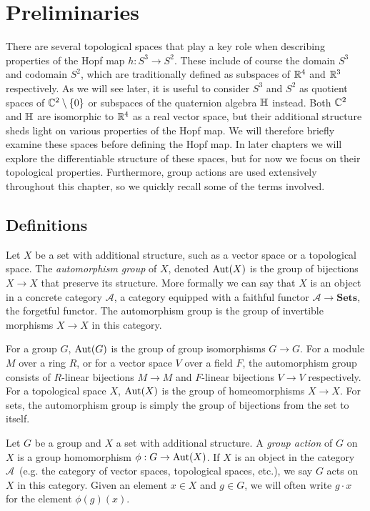 
\chapter{Preliminaries}
\label{chap:preliminaries}
There are several topological spaces that play a key role
when describing properties of the Hopf map $h : S^3 \to S^2\!$.
These include of course the domain $S^3$ and codomain $S^2\!$,
which are traditionally defined as subspaces of $\mathbb{R}^4$ and $\mathbb{R}^3$ respectively.
As we will see later,
it is useful to consider $S^3$ and $S^2$ as quotient spaces of $\mathbb{C}^2 \setminus \{ 0 \}$
or subspaces of the quaternion algebra $\mathbb{H}$ instead.
Both $\mathbb{C}^2$ and $\mathbb{H}$ are isomorphic to $\mathbb{R}^4$ as a real vector space,
but their additional structure sheds light on various properties of the Hopf map.
We will therefore briefly examine these spaces before defining the Hopf map.
In later chapters we will explore the differentiable structure of these spaces,
but for now we focus on their topological properties.
Furthermore, group actions are used extensively throughout this chapter,
so we quickly recall some of the terms involved.

\section{Definitions}

Let $X$ be a set with additional structure,
such as a vector space or a topological space.
The \emph{automorphism group} of $X$,
denoted $\operatorname{Aut}(X)$ is the group of bijections $X \to X$
that preserve its structure.
More formally we can say that $X$ is an object in a concrete category $\mathcal{A}$,
a category equipped with a faithful functor $\mathcal{A} \to \mathbf{Sets}$,
the forgetful functor.
The automorphism group is the group of invertible morphisms $X \to X$
in this category.

\example
For a group $G$, $\operatorname{Aut}(G)$ is the group of group isomorphisms $G \to G$.
For a module $M$ over a ring $R$,
or for a vector space $V$ over a field $F$,
the automorphism group consists of $R$-linear bijections $M \to M$
and $F$-linear bijections $V \to V$ respectively.
For a topological space $X$,
$\operatorname{Aut}(X)$ is the group of homeomorphisms $X \to X$.
For sets, the automorphism group is simply the group of bijections
from the set to itself.

Let $G$ be a group and $X$ a set with additional structure.
A \emph{group action} of $G$ on $X$ is a group homomorphism $\phi : G \to \operatorname{Aut}(X)$.
If $X$ is an object in the category $\mathcal{A}$ \,(e.g. the category of vector spaces,
topological spaces, etc.),
we say $G$ acts on $X$ in this category.
Given an element $x \in X$ and $g \in G$,
we will often write $g \cdot x$ for the element $\phi(g)(x)$.


